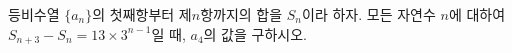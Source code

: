 등비수열 $\{a_n\}$의 첫째항부터 제$n$항까지의 합을 $S_n$이라 하자. 모든 자연수 $n$에 대하여 $S_{n+3}-S_n=13\times 3^{n-1}$일 때, $a_4$의 값을 구하시오.
